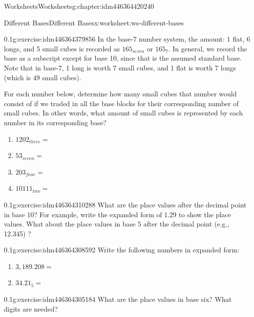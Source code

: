 \documentclass[twoside,11pt,]{book}
\begin{document}
\begin{chapterptx}{Worksheets}{}{Worksheets}{}{}{g:chapter:idm446364420240}
\typeout{************************************************}
%
\begin{worksheet-section-numberless}{Different Bases}{}{Different Bases}{}{}{x:worksheet:ws-different-bases}
\begin{divisionexercise}{1}{}{0.1}{g:exercise:idm446364379856}%
In the base-7 number system, the amount: 1 flat, 6 longs, and 5 small cubes is recorded as \(165_{seven}\) or \(165_7\). In general, we record the base as a subscript except for base 10, since that is the assumed standard base.  Note that in base-7, 1 long is worth 7 small cubes, and 1 flat is worth 7 longs (which is 49 small cubes).%
\par
For each number below, determine how many small cubes that number would consist of if we traded in all the base blocks for their corresponding number of small cubes.  In other words, what amount of small cubes is represented by each number in its corresponding base?%
%
\begin{enumerate}[label=(\alph*)]
\item{}\(1202_{three}   = \)%
\item{}\(53_{seven}       = \)%
\item{}\(203_{four}       = \)%
\item{}\(10111_{two}       = \)%
\end{enumerate}
\end{divisionexercise}%
\begin{divisionexercise}{2}{}{0.1}{g:exercise:idm446364310288}%
What are the place values after the decimal point in base 10? For example, write the expanded form of 1.29 to show the place values. What about the place values in base 5 after the decimal point (e.g., 12.345) ?%
\end{divisionexercise}%
\begin{divisionexercise}{3}{}{0.1}{g:exercise:idm446364308592}%
Write the following numbers in expanded form:%
%
\begin{enumerate}[label=(\alph*)]
\item{}\(3,189.208 = \)%
\item{}\(34.21_5      = \)%
\end{enumerate}
\end{divisionexercise}%
\begin{divisionexercise}{4}{}{0.1}{g:exercise:idm446364305184}%
What are the place values in base six?  What digits are needed?%
\end{divisionexercise}%

\end{worksheet-section-numberless}
\end{chapterptx}
\end{document}
